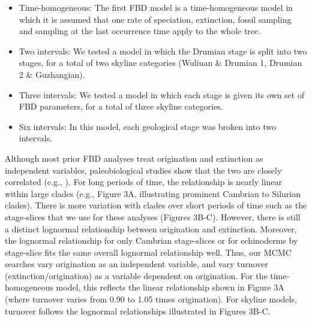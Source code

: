 \documentclass{article}
\begin{document}
\begin{itemize}
\item Time-homogeneous: The first FBD model is a time-homogeneous model in which it is assumed that one rate of speciation, extinction, fossil sampling and sampling at the last occurrence time apply to the whole tree. 
\item Two intervals: We tested a model in which the Drumian stage is split into two stages, for a total of two skyline categories (Wuliuan \& Drumian 1, Drumian 2 \& Guzhangian).
\item Three intervals: We tested a model in which each stage is given its own set of FBD parameters, for a total of three skyline categories.
\item Six intervals: In this model, each geological stage was broken into two intervals.
\end{itemize}
Although most prior FBD analyses treat origination and extinction as independent variables, paleobiological studies show that the two are closely correlated (e.g., \citep{Marshall2017}). For long periods of time, the relationship is nearly linear within large clades (e.g., Figure 3A, illustrating prominent Cambrian to Silurian clades). There is more variation with clades over short periods of time such as the stage-slices that we use for these analyses (Figures 3B-C). However, there is still a distinct lognormal relationship between origination and extinction. Moreover, the lognormal relationship for only Cambrian stage-slices or for echinoderms by stage-slice fits the same overall lognormal relationship well.  Thus, our MCMC searches vary origination as an independent variable, and vary turnover (extinction/origination) as a variable dependent on origination. For the time-homogeneous model, this reflects the linear relationship shown in Figure 3A (where turnover varies from 0.90 to 1.05 times origination).  For skyline models, turnover follows the lognormal relationships illustrated in Figures 3B-C.
\end{document}
